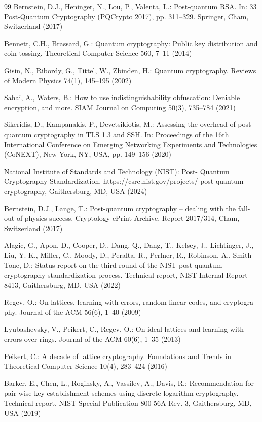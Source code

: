\documentclass[5p,times]{elsarticle}
\begin{document}
\begin{thebibliography}{99}
Bernstein, D.J., Heninger, N., Lou, P., Valenta, L.: Post-quantum RSA. In: 33 Post-Quantum Cryptography (PQCrypto 2017), pp. 311--329. Springer, Cham, Switzerland (2017)

Bennett, C.H., Brassard, G.: Quantum cryptography: Public key distribution and coin tossing. Theoretical Computer Science 560, 7--11 (2014)

Gisin, N., Ribordy, G., Tittel, W., Zbinden, H.: Quantum cryptography. Reviews of Modern Physics 74(1), 145--195 (2002)

Sahai, A., Waters, B.: How to use indistinguishability obfuscation: Deniable encryption, and more. SIAM Journal on Computing 50(3), 735--784 (2021)

Sikeridis, D., Kampanakis, P., Devetsikiotis, M.: Assessing the overhead of post-quantum cryptography in TLS 1.3 and SSH. In: Proceedings of the 16th International Conference on Emerging Networking Experiments and Technologies (CoNEXT), New York, NY, USA, pp. 149--156 (2020)

National Institute of Standards and Technology (NIST): Post- Quantum Cryptography Standardization. https://csrc.nist.gov/projects/ post-quantum-cryptography, Gaithersburg, MD, USA (2024)

Bernstein, D.J., Lange, T.: Post-quantum cryptography -- dealing with the fall- out of physics success. Cryptology ePrint Archive, Report 2017/314, Cham, Switzerland (2017)

Alagic, G., Apon, D., Cooper, D., Dang, Q., Dang, T., Kelsey, J., Lichtinger, J., Liu, Y.-K., Miller, C., Moody, D., Peralta, R., Perlner, R., Robinson, A., Smith-Tone, D.: Status report on the third round of the NIST post-quantum cryptography standardization process. Technical report, NIST Internal Report 8413, Gaithersburg, MD, USA (2022)

Regev, O.: On lattices, learning with errors, random linear codes, and cryptogra- phy. Journal of the ACM 56(6), 1--40 (2009)

Lyubashevsky, V., Peikert, C., Regev, O.: On ideal lattices and learning with errors over rings. Journal of the ACM 60(6), 1--35 (2013)

Peikert, C.: A decade of lattice cryptography. Foundations and Trends in Theoretical Computer Science 10(4), 283--424 (2016)

Barker, E., Chen, L., Roginsky, A., Vassilev, A., Davis, R.: Recommendation for pair-wise key-establishment schemes using discrete logarithm cryptography. Technical report, NIST Special Publication 800-56A Rev. 3, Gaithersburg, MD, USA (2019)


\end{thebibliography}
\end{document}
